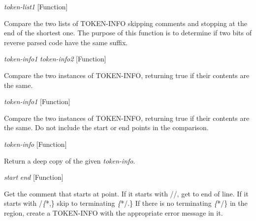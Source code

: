 \vspace{1em}
\noindent
{}
\usebox{\funcname}\emph{token-list1}
 \hfill [Function]
\hspace*{\wd\funcname}

\begin{doc-string}
Compare the two lists of TOKEN-INFO skipping comments and stopping at the end
of the shortest one.  The purpose of this function is to determine if two bits
of reverse parsed code have the same suffix.
\end{doc-string}

\vspace{1em}
\noindent
{}
\usebox{\funcname}\emph{token-info1} \emph{token-info2}
 \hfill [Function]

\begin{doc-string}
Compare the two instances of TOKEN-INFO, returning true if their contents
are the same.
\end{doc-string}

\vspace{1em}
\noindent
{}
\usebox{\funcname}\emph{token-info1}
 \hfill [Function]
\hspace*{\wd\funcname}

\begin{doc-string}
Compare the two instances of TOKEN-INFO, returning true if their contents
are the same.  Do not include the start or end points in the comparison.
\end{doc-string}

\vspace{1em}
\noindent
{}
\usebox{\funcname}\emph{token-info}
 \hfill [Function]

\begin{doc-string}
Return a deep copy of the given \emph{token-info}.
\end{doc-string}

\vspace{1em}
\noindent
{}
\usebox{\funcname}\emph{start} \emph{end}
 \hfill [Function]

\begin{doc-string}
Get the comment that starts at point.  If it starts with //, get to end of
line.  If it starts with /\emph\{*,\} skip to terminating \emph\{*/.\}  If there is no terminating
\emph\{*/\} in the region, create a TOKEN-INFO with the appropriate error message in it.
\end{doc-string}

